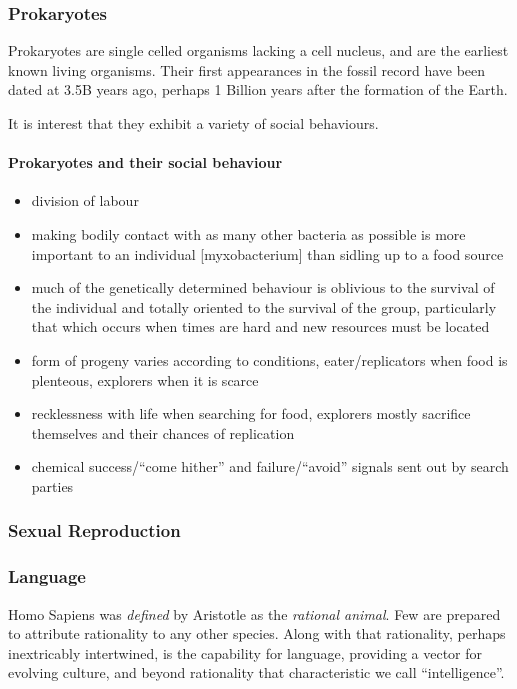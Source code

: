 \documentclass[10pt,titlepage]{article}
\begin{document}
\subsubsection {Prokaryotes}

Prokaryotes are single celled organisms lacking a cell nucleus, and are the earliest known living organisms.
Their first appearances in the fossil record have been dated at 3.5B years ago, perhaps 1 Billion years after the formation of the Earth. 


It is interest that they exhibit a variety of social behaviours.

\paragraph{Prokaryotes and their social behaviour}
  \begin{itemize}
  \item  division of labour
  \item making bodily contact with as many other bacteria as possible is more important to an individual [myxobacterium] than sidling up to a food source
  \item much of the genetically determined behaviour is oblivious to the survival of the individual and totally oriented to the survival of the group, particularly that which occurs when times are hard and new resources must be located
  \item form of progeny varies according to conditions, eater/replicators when food is plenteous, explorers when it is scarce
  \item recklessness with life when searching for food, explorers mostly sacrifice themselves and their chances of replication
  \item chemical success/``come hither'' and failure/``avoid'' signals sent out by search parties
    \end{itemize}

\subsubsection{Sexual Reproduction}

\subsubsection{Language}

Homo Sapiens was \emph{defined} by Aristotle as the \emph{rational animal}.
Few are prepared to attribute rationality to any other species.
Along with that rationality, perhaps inextricably intertwined, is the capability for language, providing a vector for evolving culture, and beyond rationality that characteristic we call ``intelligence''.
\end{document}
